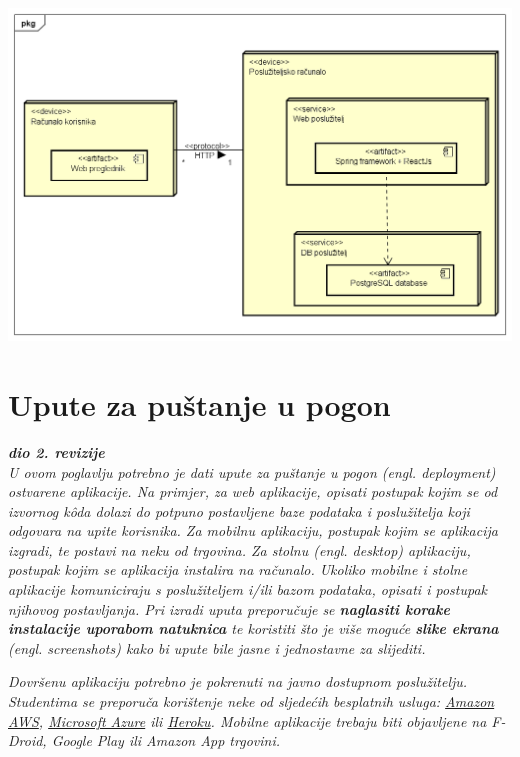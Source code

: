 			\includegraphics[scale=0.5]{dijagrami/Dijagram razmjestaja.png}
			
			\eject 
		
		\section{Upute za puštanje u pogon}
		
			\textbf{\textit{dio 2. revizije}}\\
		
			 \textit{U ovom poglavlju potrebno je dati upute za puštanje u pogon (engl. deployment) ostvarene aplikacije. Na primjer, za web aplikacije, opisati postupak kojim se od izvornog kôda dolazi do potpuno postavljene baze podataka i poslužitelja koji odgovara na upite korisnika. Za mobilnu aplikaciju, postupak kojim se aplikacija izgradi, te postavi na neku od trgovina. Za stolnu (engl. desktop) aplikaciju, postupak kojim se aplikacija instalira na računalo. Ukoliko mobilne i stolne aplikacije komuniciraju s poslužiteljem i/ili bazom podataka, opisati i postupak njihovog postavljanja. Pri izradi uputa preporučuje se \textbf{naglasiti korake instalacije uporabom natuknica} te koristiti što je više moguće \textbf{slike ekrana} (engl. screenshots) kako bi upute bile jasne i jednostavne za slijediti.}
			
			
			 \textit{Dovršenu aplikaciju potrebno je pokrenuti na javno dostupnom poslužitelju. Studentima se preporuča korištenje neke od sljedećih besplatnih usluga: \href{https://aws.amazon.com/}{Amazon AWS}, \href{https://azure.microsoft.com/en-us/}{Microsoft Azure} ili \href{https://www.heroku.com/}{Heroku}. Mobilne aplikacije trebaju biti objavljene na F-Droid, Google Play ili Amazon App trgovini.}
			
			
			\eject 